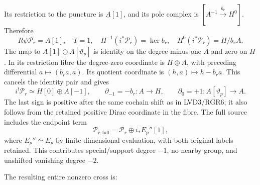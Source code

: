 Its restriction to the puncture is \(\underline A[1]\), and its pole
complex is \([A^{-1}\xrightarrow{b_r}H^0]\). Therefore \[
R\psi\mathscr P_r=A[1],\quad T=1,\quad
H^{-1}(i^*\mathscr P_r)=\ker b_r,\quad
H^0(i^*\mathscr P_r)=H/b_rA.
\tag{ADC8.6}
\] The map to \(A[1]\oplus A[\vartheta_p]\) is identity on the
degree-minus-one \(A\) and zero on \(H\). In its restriction fibre the
degree-zero coordinate is \(H\oplus A\), with preceding differential
\(a\mapsto(b_ra,a)\). Its quotient coordinate is
\((h,a)\mapsto h-b_ra\). This cancels the identity pair and gives \[
i^!\mathscr P_r\simeq H[0]\oplus A[-1],\qquad
\partial_{-1}=-b_r:A\to H,\qquad
\partial_0=+1:A[\vartheta_p]\to A.
\tag{ADC8.7}
\] The last sign is positive after the same cochain shift as in
LVD3/RGR6; it also follows from the retained positive Dirac coordinate
in the fibre. The full source includes the endpoint term \[
\mathscr P_{r,\mathrm{full}}=\mathscr P_r\oplus i_*E_p''[1],
\tag{ADC8.8}
\] where \(E_p''\simeq E_p\) by finite-dimensional evaluation, with both
original labels retained. This contributes special/support degree
\(-1\), no nearby group, and unshifted vanishing degree \(-2\).

The resulting entire nonzero cross is:

